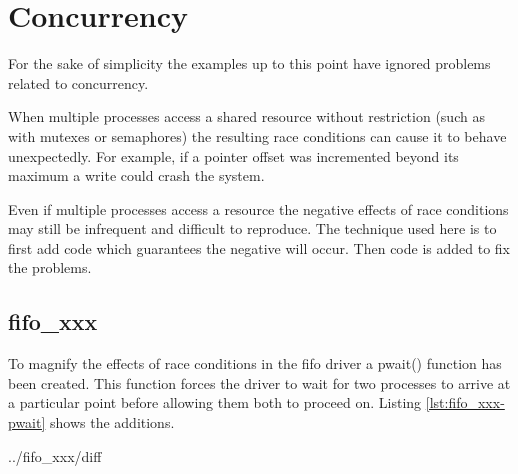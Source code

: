 \documentclass{article}
\begin{document}
\clearpage
\section{Concurrency}

For the sake of simplicity the examples up to this point have
ignored problems related to concurrency.

When multiple processes access a shared resource without restriction
(such as with mutexes or semaphores) the resulting race conditions
can cause it to behave unexpectedly.
For example, if a pointer offset was incremented beyond its maximum
a write could crash the system.

Even if multiple processes access a resource the negative effects of
race conditions may still be infrequent and difficult to reproduce.
The technique used here is to first add code which guarantees the negative
will occur.
Then code is added to fix the problems.

\subsection{fifo\_xxx}

To magnify the effects of race conditions in the fifo driver
a pwait() function has been created.
This function forces the driver to wait for two processes
to arrive at a particular point before allowing them both to proceed on.
Listing \ref{lst:fifo_xxx-pwait} shows the additions.


	{../fifo_xxx/diff}
\end{document}
